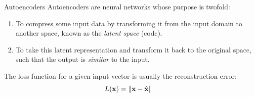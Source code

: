 \documentclass[handout,xcolor=pdftex,dvipsnames,table,mathserif]{beamer}
\begin{document}
\begin{frame}{Autoencoders}
Autoencoders are neural networks whose purpose is twofold:
\begin{enumerate}
\item To compress some input data by transforming it from the input domain to another space,
known as the \emph{latent space} (code).
\item To take this latent representation and transform it back to the original space, such that the output is \emph{similar} to the input.
\end{enumerate}

\begin{figure}
\centering
{}
\end{figure}

The loss function for a given input vector is usually the reconstruction error:
\[
L(\mathbf{x}) = \norm{ \mathbf{x}-\hat{\mathbf{x}}}
\]


\end{frame}
\end{document}
